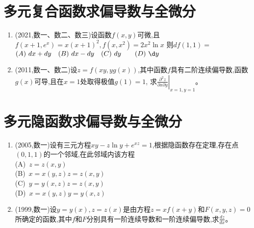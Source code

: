 \documentclass[12pt, a4paper, oneside, UTF8]{ctexbook}
\begin{document}
\section{多元复合函数求偏导数与全微分}

\begin{enumerate}[label=\arabic*.,start=4]
    \item (2021,数一、数二、数三)设函数$f(x,y)$可微,且$f(x+1,e^x)=x(x+1)^2,f(x,x^2)=2x^2\ln x$
    则$df(1,1)=$ \\
    $(A)\ dx+dy \quad (B)\ dx-dy \quad (C)\ dy\qquad (D)\ \d y$
    
    \begin{solution}
    \newpage
    \end{solution}
    
    \item (2011,数一、数二)设$z=f(xy,yg(x))$,其中函数$f$具有二阶连续偏导数,函数$g(x)$可导,且在$x=1$处取得极值$g(1)=1$,
    求$\displaystyle\left.\frac{\partial^2 z}{\partial x\partial y}\right|_{x=1,y=1}$。
    
    \begin{solution}
    \newpage
    \end{solution}
\end{enumerate}

\section{多元隐函数求偏导数与全微分}

\begin{enumerate}[label=\arabic*.,start=6]
    \item (2005,数一)设有三元方程$xy-z\ln y+e^{xz}=1$,根据隐函数存在定理,存在点$(0,1,1)$的一个邻域,在此邻域内该方程 \\
    (A)\ $z=z(x,y)$ \\
    (B)\ $x=x(y,z)$$z=z(x,y)$ \\
    (C)\ $y=y(x,z)$$z=z(x,y)$ \\
    (D)\ $x=x(y,z)$$y=y(x,z)$

    \begin{solution}
    \newpage
    \end{solution}
    
    \item (1999,数一)设$y=y(x),z=z(x)$是由方程$z=xf(x+y)$和$F(x,y,z)=0$所确定的函数,其中$f$和$F$分别具有一阶连续导数和一阶连续偏导数,求$\frac{dz}{dx}$。
    
    \begin{solution}
    \newpage
    \end{solution}
\end{enumerate}
\end{document}
